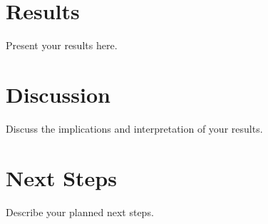 \documentclass[midterm]{sparreport}
\begin{document}

\section{Results}

Present your results here.

\section{Discussion}

Discuss the implications and interpretation of your results.

\section{Next Steps}

Describe your planned next steps.





\end{document}
